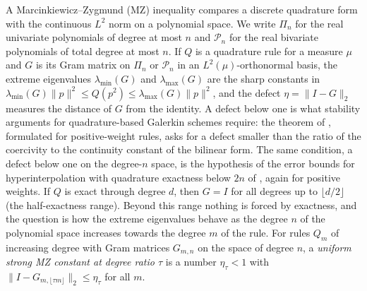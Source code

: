 \documentclass[preprint,12pt,a4paper]{elsarticle}
\theoremstyle{remark}
\newcommand{\lamin}{\lambda_{\min}}
\newcommand{\lamax}{\lambda_{\max}}
\begin{document}
A Marcinkiewicz--Zygmund (MZ) inequality compares a discrete quadrature form
with the continuous $L^2$ norm on a polynomial space. We write $\Pi_n$ for the
real univariate polynomials of degree at most $n$ and $\mathcal P_n$ for the real
bivariate polynomials of total degree at most $n$. If $Q$ is a quadrature
rule for a measure $\mu$ and $G$ is its Gram matrix on $\Pi_n$ or $\mathcal P_n$
in an $L^2(\mu)$-orthonormal basis, the extreme eigenvalues
$\lamin(G)$ and $\lamax(G)$ are the sharp constants in
$\lamin(G)\|p\|^2\le Q(p^2)\le\lamax(G)\|p\|^2$, and the defect
$\eta=\|I-G\|_2$ measures the distance of $G$ from the identity. A defect below
one is what stability arguments for quadrature-based Galerkin schemes
require: the theorem of \citet{Wu26}, formulated for positive-weight rules,
asks for a defect smaller than the ratio of the coercivity to the continuity
constant of the bilinear form. The same condition, a defect below one on the
degree-$n$ space, is the hypothesis of the error bounds for hyperinterpolation
with quadrature exactness below $2n$ of \citet{AW22}, again for positive weights.
If $Q$ is exact
through degree $d$, then $G=I$ for all degrees up to $\lfloor d/2\rfloor$
(the half-exactness range). Beyond this range nothing is forced by exactness,
and the question is how the extreme eigenvalues behave as the degree $n$ of the
polynomial space increases towards the degree $m$ of the rule. For rules $Q_m$
of increasing degree with Gram matrices $G_{m,n}$ on the space of degree $n$, a
\emph{uniform strong MZ constant at degree ratio $\tau$} is a number
$\eta_\tau<1$ with $\|I-G_{m,\lfloor\tau m\rfloor}\|_2\le\eta_\tau$ for all $m$.
\end{document}
